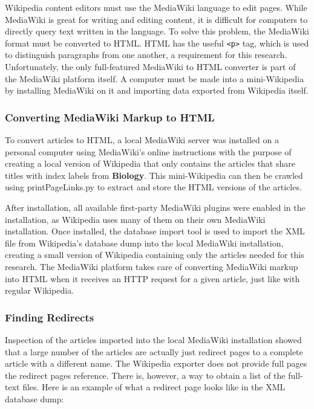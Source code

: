 Wikipedia content editors must use the MediaWiki language to edit pages. 
While MediaWiki is great for writing and editing content, it is difficult for computers to directly query text written in the language.
To solve this problem, the MediaWiki format must be converted to HTML.
HTML has the useful {\tt <p>} tag, which is used to distinguish paragraphs from one another, a requirement for this research. 
Unfortunately, the only full-featured MediaWiki to HTML converter is part of the MediaWiki platform itself.
A computer must be made into a mini-Wikipedia by installing MediaWiki on it and importing data exported from Wikipedia itself.

\subsubsection{Converting MediaWiki Markup to HTML}

To convert articles to HTML, a local MediaWiki server was installed on a personal computer using MediaWiki's online instructions \cite{mediawiki-installation} with the purpose of creating a local version of Wikipedia that only contains the articles that share titles with index labels from {\bf Biology}.
This mini-Wikipedia can then be crawled using printPageLinks.py to extract and store the HTML versions of the articles.

After installation, all available first-party MediaWiki plugins were enabled in the installation, as Wikipedia uses many of them on their own MediaWiki installation.
Once installed, the database import tool \cite{mediawiki-import} is used to import the XML file from Wikipedia's database dump into the local MediaWiki installation, creating a small version of Wikipedia containing only the articles needed for this research.
The MediaWiki platform takes care of converting MediaWiki markup into HTML when it receives an HTTP request for a given article, just like with regular Wikipedia.

\subsubsection{Finding Redirects}
\label{subsec:finding-redirects}

Inspection of the articles imported into the local MediaWiki installation showed that a large number of the articles are actually just redirect pages to a complete article with a different name.
The Wikipedia exporter does not provide full pages the redirect pages reference.
There is, however, a way to obtain a list of the full-text files.
Here is an example of what a redirect page looks like in the XML database dump:

